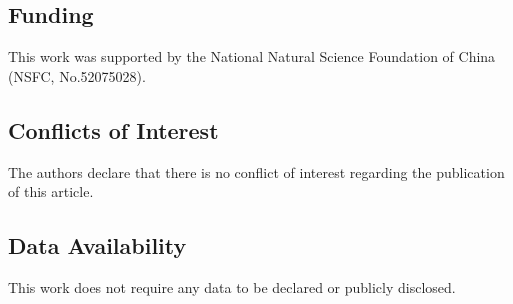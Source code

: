 \documentclass{article}
\begin{document}
\subsection*{Funding}

This work was supported by the National Natural Science Foundation of China (NSFC, No.52075028).

\subsection*{Conflicts of Interest}

The authors declare that there is no conflict of interest regarding the publication of this article.

\subsection*{Data Availability}

This work does not require any data to be declared or publicly disclosed.

% 
% 

\printbibliography
\end{document}
